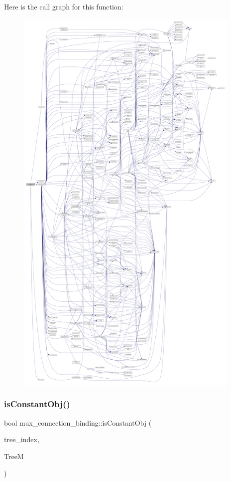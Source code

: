 Here is the call graph for this function\+:
\nopagebreak
\begin{figure}[H]
\begin{center}
\leavevmode
\includegraphics[height=550pt]{d7/d1e/classmux__connection__binding_a87b0d8d8254080cb835394a5eb56eedf_cgraph}
\end{center}
\end{figure}
\mbox{\label{classmux__connection__binding_a89c0ed6afea0b88bf31e8e6dcefc0f63}} 
\subsubsection{\texorpdfstring{is\+Constant\+Obj()}{isConstantObj()}}
{\footnotesize\ttfamily bool mux\+\_\+connection\+\_\+binding\+::is\+Constant\+Obj (\begin{DoxyParamCaption}\item[{unsigned int}]{tree\+\_\+index,  }\item[{const \hyperlink{tree__manager_8hpp_a96ff150c071ce11a9a7a1e40590f205e}{tree\+\_\+manager\+Ref}}]{TreeM }\end{DoxyParamCaption})\hspace{0.3cm}{\ttfamily [private]}}



